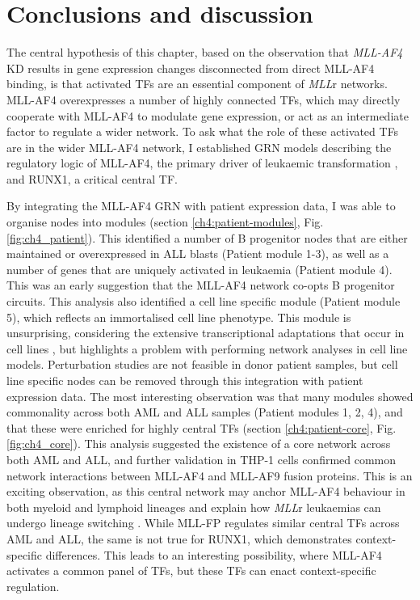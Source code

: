 \clearpage
\section{Conclusions and discussion}

The central hypothesis of this chapter, based on the observation that \textit{MLL-AF4} KD results in gene expression changes disconnected from direct MLL-AF4 binding, is that activated TFs are an essential component of \textit{MLL}r networks. MLL-AF4 overexpresses a number of highly connected TFs, which may directly cooperate with MLL-AF4 to modulate gene expression, or act as an intermediate factor to regulate a wider network. To ask what the role of these activated TFs are in the wider MLL-AF4 network, I established GRN models describing the regulatory logic of MLL-AF4, the primary driver of leukaemic transformation \citep{andersson_landscape_2015, bardini_dna_2010, bardini_implementation_2011}, and RUNX1, a critical central TF. 

By integrating the MLL-AF4 GRN with patient expression data, I was able to organise nodes into modules (section \ref{ch4:patient-modules}, Fig. \ref{fig:ch4_patient}). This identified a number of B progenitor nodes that are either maintained or overexpressed in ALL blasts (Patient module 1-3), as well as a number of genes that are uniquely activated in leukaemia (Patient module 4). This was an early suggestion that the MLL-AF4 network co-opts B progenitor circuits. This analysis also identified a cell line specific module (Patient module 5), which reflects an immortalised cell line phenotype. This module is unsurprising, considering the extensive transcriptional adaptations that occur in cell lines \citep{lopes-ramos_regulatory_2017}, but highlights a problem with performing network analyses in cell line models. Perturbation studies are not feasible in donor patient samples, but cell line specific nodes can be removed through this integration with patient expression data. The most interesting observation was that many modules showed commonality across both AML and ALL samples (Patient modules 1, 2, 4), and that these were enriched for highly central TFs (section \ref{ch4:patient-core}, Fig. \ref{fig:ch4_core}). This analysis suggested the existence of a core network across both AML and ALL, and further validation in THP-1 cells confirmed common network interactions between MLL-AF4 and MLL-AF9 fusion proteins. This is an exciting observation, as this central network may anchor MLL-AF4 behaviour in both myeloid and lymphoid lineages and explain how \textit{MLL}r leukaemias can undergo lineage switching \citep{dorantes-acosta_lineage_2012, gardner_acquisition_2016}. While MLL-FP regulates similar central TFs across AML and ALL, the same is not true for RUNX1, which demonstrates context-specific differences. This leads to an interesting possibility, where MLL-AF4 activates a common panel of TFs, but these TFs can enact context-specific regulation.

